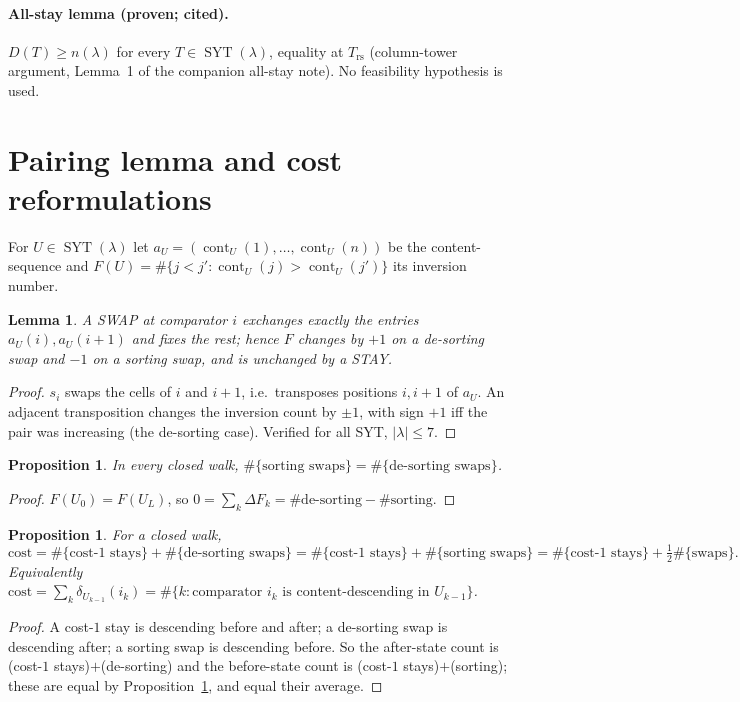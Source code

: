 \documentclass[11pt]{article}
\theoremstyle{plain}
\newtheorem{lemma}[theorem]{Lemma}
\newtheorem{proposition}[theorem]{Proposition}
\theoremstyle{remark}
\newcommand{\SYT}{\operatorname{SYT}}
\newcommand{\cont}{\operatorname{cont}}
\newcommand{\cost}{\mathrm{cost}}
\begin{document}
\paragraph{All-stay lemma (proven; cited).} $D(T)\ge n(\lambda)$ for every $T\in\SYT(\lambda)$,
equality at $T_{\mathrm{rs}}$ (column-tower argument, Lemma~1 of the companion all-stay note).
No feasibility hypothesis is used.

\section{Pairing lemma and cost reformulations}
For $U\in\SYT(\lambda)$ let $a_U=(\cont_U(1),\dots,\cont_U(n))$ be the content-sequence and
$F(U)=\#\{j<j':\cont_U(j)>\cont_U(j')\}$ its inversion number.

\begin{lemma}\label{lem:adj}
A SWAP at comparator $i$ exchanges exactly the entries $a_U(i),a_U(i{+}1)$ and fixes the
rest; hence $F$ changes by $+1$ on a de-sorting swap and $-1$ on a sorting swap, and is
unchanged by a STAY.
\end{lemma}
\begin{proof}
$s_i$ swaps the cells of $i$ and $i{+}1$, i.e.\ transposes positions $i,i{+}1$ of $a_U$.
An adjacent transposition changes the inversion count by $\pm1$, with sign $+1$ iff the
pair was increasing (the de-sorting case). Verified for all SYT, $|\lambda|\le7$.
\end{proof}

\begin{proposition}\label{prop:pair}
In every closed walk, $\#\{\text{sorting swaps}\}=\#\{\text{de-sorting swaps}\}$.
\end{proposition}
\begin{proof}
$F(U_0)=F(U_L)$, so $0=\sum_k\Delta F_k=\#\text{de-sorting}-\#\text{sorting}$.
\end{proof}

\begin{proposition}\label{prop:reform}
For a closed walk,
\[
\cost=\#\{\text{cost-}1\text{ stays}\}+\#\{\text{de-sorting swaps}\}
     =\#\{\text{cost-}1\text{ stays}\}+\#\{\text{sorting swaps}\}
     =\#\{\text{cost-}1\text{ stays}\}+\tfrac12\#\{\text{swaps}\}.
\]
Equivalently $\cost=\sum_k\delta_{U_{k-1}}(i_k)
=\#\{k:\text{comparator }i_k\text{ is content-descending in }U_{k-1}\}$.
\end{proposition}
\begin{proof}
A cost-$1$ stay is descending before and after; a de-sorting swap is descending after; a
sorting swap is descending before. So the after-state count is
(cost-$1$ stays)$+$(de-sorting) and the before-state count is (cost-$1$ stays)$+$(sorting);
these are equal by Proposition~\ref{prop:pair}, and equal their average.
\end{proof}
\end{document}
